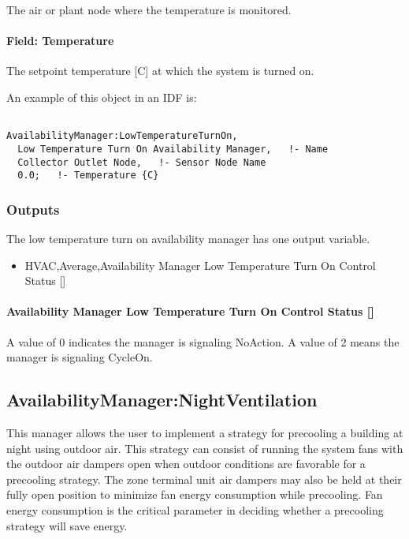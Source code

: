 The air or plant node where the temperature is monitored.

\paragraph{Field: Temperature}\label{field-temperature-3}

The setpoint temperature {[}C{]} at which the system is turned on.

An example of this object in an IDF is:

\begin{lstlisting}

AvailabilityManager:LowTemperatureTurnOn,
  Low Temperature Turn On Availability Manager,   !- Name
  Collector Outlet Node,   !- Sensor Node Name
  0.0;   !- Temperature {C}
\end{lstlisting}

\subsubsection{Outputs}\label{outputs-7-010}

The low temperature turn on availability manager has one output variable.

\begin{itemize}
\tightlist
\item
  HVAC,Average,Availability Manager Low Temperature Turn On Control Status {[]}
\end{itemize}

\paragraph{Availability Manager Low Temperature Turn On Control Status {[]}}\label{availability-manager-low-temperature-turn-on-control-status}

A value of 0 indicates the manager is signaling NoAction. A value of 2 means the manager is signaling CycleOn.

\subsection{AvailabilityManager:NightVentilation}\label{availabilitymanagernightventilation}

This manager allows the user to implement a strategy for precooling a building at night using outdoor air. This strategy can consist of running the system fans with the outdoor air dampers open when outdoor conditions are favorable for a precooling strategy. The zone terminal unit air dampers may also be held at their fully open position to minimize fan energy consumption while precooling. Fan energy consumption is the critical parameter in deciding whether a precooling strategy will save energy.

